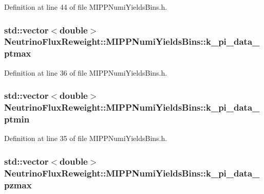 Definition at line 44 of file M\-I\-P\-P\-Numi\-Yields\-Bins.\-h.

\hypertarget{class_neutrino_flux_reweight_1_1_m_i_p_p_numi_yields_bins_a589ef2889679d14791b9542303fc1322}{
\subsubsection[{k\-\_\-pi\-\_\-data\-\_\-ptmax}]{\setlength{\rightskip}{0pt plus 5cm}std\-::vector$<$double$>$ Neutrino\-Flux\-Reweight\-::\-M\-I\-P\-P\-Numi\-Yields\-Bins\-::k\-\_\-pi\-\_\-data\-\_\-ptmax}}\label{class_neutrino_flux_reweight_1_1_m_i_p_p_numi_yields_bins_a589ef2889679d14791b9542303fc1322}


Definition at line 36 of file M\-I\-P\-P\-Numi\-Yields\-Bins.\-h.

\hypertarget{class_neutrino_flux_reweight_1_1_m_i_p_p_numi_yields_bins_a91fe79424c764ccccd3cc31ca91b8cd1}{
\subsubsection[{k\-\_\-pi\-\_\-data\-\_\-ptmin}]{\setlength{\rightskip}{0pt plus 5cm}std\-::vector$<$double$>$ Neutrino\-Flux\-Reweight\-::\-M\-I\-P\-P\-Numi\-Yields\-Bins\-::k\-\_\-pi\-\_\-data\-\_\-ptmin}}\label{class_neutrino_flux_reweight_1_1_m_i_p_p_numi_yields_bins_a91fe79424c764ccccd3cc31ca91b8cd1}


Definition at line 35 of file M\-I\-P\-P\-Numi\-Yields\-Bins.\-h.

\hypertarget{class_neutrino_flux_reweight_1_1_m_i_p_p_numi_yields_bins_a1832b84f72664c0088c5f8cff20bb041}{
\subsubsection[{k\-\_\-pi\-\_\-data\-\_\-pzmax}]{\setlength{\rightskip}{0pt plus 5cm}std\-::vector$<$double$>$ Neutrino\-Flux\-Reweight\-::\-M\-I\-P\-P\-Numi\-Yields\-Bins\-::k\-\_\-pi\-\_\-data\-\_\-pzmax}}\label{class_neutrino_flux_reweight_1_1_m_i_p_p_numi_yields_bins_a1832b84f72664c0088c5f8cff20bb041}


